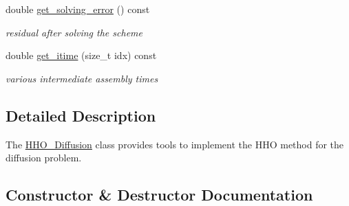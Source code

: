 \begin{DoxyCompactItemize}
double \hyperlink{classHArDCore2D_1_1HHO__Diffusion_ad53ffa4a52af7bf6803e28f36c7e3365}{get\+\_\+solving\+\_\+error} () const
\begin{DoxyCompactList}\small\item\em residual after solving the scheme \end{DoxyCompactList}\item 
\mbox{\label{classHArDCore2D_1_1HHO__Diffusion_a43051dfce03a9f75c33903f1736f4e1a}} 
double \hyperlink{classHArDCore2D_1_1HHO__Diffusion_a43051dfce03a9f75c33903f1736f4e1a}{get\+\_\+itime} (size\+\_\+t idx) const
\begin{DoxyCompactList}\small\item\em various intermediate assembly times \end{DoxyCompactList}\end{DoxyCompactItemize}


\subsection{Detailed Description}
The \hyperlink{classHArDCore2D_1_1HHO__Diffusion}{H\+H\+O\+\_\+\+Diffusion} class provides tools to implement the H\+HO method for the diffusion problem. 

\subsection{Constructor \& Destructor Documentation}
\mbox{\label{classHArDCore2D_1_1HHO__Diffusion_a9ab2e2cdf0c77f60069f7572c587c4f1}} 
